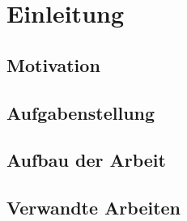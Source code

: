 \chapter{Einleitung}
\section{Motivation}

\section{Aufgabenstellung}

\section{Aufbau der Arbeit}

\section{Verwandte Arbeiten}

\pagebreak

